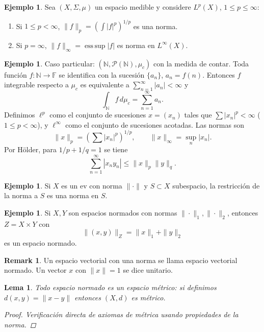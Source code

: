 \documentclass[11pt]{article}
\theoremstyle{definition}
\newtheorem{example}[definition]{Ejemplo}
\newtheorem{remark}[definition]{Remark}
\theoremstyle{plain}
\newtheorem{lemma}[definition]{Lema}
\begin{document}
\begin{example}
Sea $(X,\Sigma,\mu)$ un espacio medible y considere $L^p(X)$, $1\le p\le\infty$:
\begin{enumerate}[label=(\alph*)]
\item Si $1\le p<\infty$, $\|f\|_p=(\int|f|^p)^{1/p}$ es una norma.
\item Si $p=\infty$, $\|f\|_\infty=\operatorname{ess\,sup}|f|$ es norma en $L^\infty(X)$.
\end{enumerate}
\end{example}

\begin{example}
Caso particular: $(\mathbb{N},\mathcal{P}(\mathbb{N}),\mu_c)$ con la medida de contar. Toda función $f:\mathbb{N}\to\mathbb{F}$ se identifica con la sucesión $\{a_n\}$, $a_n=f(n)$. Entonces
$f$ integrable respecto a $\mu_c$ es equivalente a $\sum_{n=1}^\infty|a_n|<\infty$ y
\[\int_{\mathbb{N}} f\,d\mu_c=\sum_{n=1}^\infty a_n.\]
Definimos $\ell^p$ como el conjunto de sucesiones $x=(x_n)$ tales que $\sum|x_n|^p<\infty$ ($1\le p<\infty$), y $\ell^\infty$ como el conjunto de sucesiones acotadas. Las normas son
\[\|x\|_p=(\sum|x_n|^p)^{1/p},\qquad\|x\|_\infty=\sup_n|x_n|.\]
Por Hölder, para $1/p+1/q=1$ se tiene
\[\sum_{n=1}^\infty|x_ny_n|\le\|x\|_p\|y\|_q.
\]
\end{example}

\begin{example}
Si $X$ es un ev con norma $\|\cdot\|$ y $S\subset X$ subespacio, la restricción de la norma a $S$ es una norma en $S$.
\end{example}

\begin{example}
Si $X,Y$ son espacios normados con normas $\|\cdot\|_1,\|\cdot\|_2$, entonces $Z=X\times Y$ con
\[\|(x,y)\|_Z=\|x\|_1+\|y\|_2\]
es un espacio normado.
\end{example}

\begin{remark}
Un espacio vectorial con una norma se llama espacio vectorial normado. Un vector $x$ con $\|x\|=1$ se dice unitario.
\end{remark}

\begin{lemma}
Todo espacio normado es un espacio métrico: si definimos $d(x,y)=\|x-y\|$ entonces $(X,d)$ es métrico.
\begin{proof}
Verificación directa de axiomas de métrica usando propiedades de la norma.
\end{proof}
\end{lemma}
\end{document}
